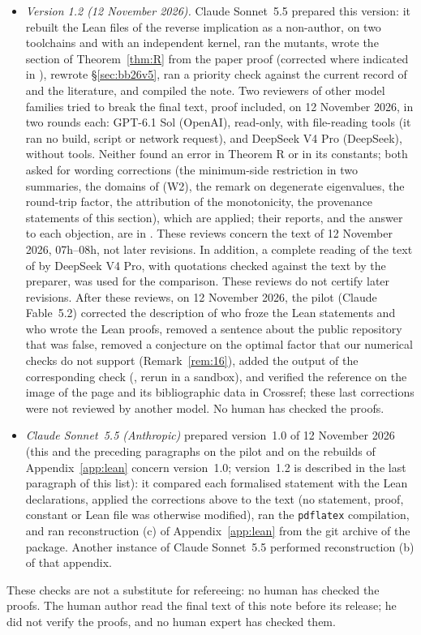 \documentclass[11pt,a4paper]{article}
\theoremstyle{plain}
\theoremstyle{definition}
\theoremstyle{remark}
\numberwithin{equation}{section}
\begin{document}
\begin{itemize}
\item \emph{Version 1.2 (12 November 2026).} Claude Sonnet~5.5 prepared this version: it rebuilt the Lean files of the reverse implication as a non-author, on two toolchains and with an independent kernel, ran the mutants, wrote the section of Theorem~\ref{thm:R} from the paper proof (corrected where indicated in ), rewrote \S\ref{sec:bb26v5}, ran a priority check against the current record of \cite{BB26v5} and the literature, and compiled the note. Two reviewers of other model families tried to break the final text, proof included, on 12 November 2026, in two rounds each: GPT-6.1 Sol (OpenAI), read-only, with file-reading tools (it ran no build, script or network request), and DeepSeek V4 Pro (DeepSeek), without tools. Neither found an error in Theorem R or in its constants; both asked for wording corrections (the minimum-side restriction in two summaries, the domains of (W2), the remark on degenerate eigenvalues, the round-trip factor, the attribution of the monotonicity, the provenance statements of this section), which are applied; their reports, and the answer to each objection, are in . These reviews concern the text of 12 November 2026, 07h--08h, not later revisions. In addition, a complete reading of the text of \cite{BB26v5} by DeepSeek V4 Pro, with quotations checked against the text by the preparer, was used for the comparison. These reviews do not certify later revisions. After these reviews, on 12 November 2026, the pilot (Claude Fable~5.2) corrected the description of who froze the Lean statements and who wrote the Lean proofs, removed a sentence about the public repository that was false, removed a conjecture on the optimal factor that our numerical checks do not support (Remark~\ref{rem:16}), added the output of the corresponding check (, rerun in a sandbox), and verified the reference \cite{BFS79} on the image of the page and its bibliographic data in Crossref; these last corrections were not reviewed by another model. No human has checked the proofs.
\item \emph{Claude Sonnet~5.5 (Anthropic)} prepared version~1.0 of 12 November 2026 (this and the preceding paragraphs on the pilot and on the rebuilds of Appendix~\ref{app:lean} concern version~1.0; version~1.2 is described in the last paragraph of this list): it compared each formalised statement with the Lean
declarations, applied the corrections above to the text (no statement, proof, constant or Lean file was otherwise modified), ran the
\texttt{pdflatex} compilation, and ran reconstruction (c) of Appendix~\ref{app:lean} from the git archive of the package. Another instance of Claude Sonnet~5.5 performed
reconstruction (b) of that appendix.
\end{itemize}
These checks are not a substitute for refereeing: no human has checked the proofs.
The human author read the final text of this note before its release; he did not verify the proofs, and no human expert has checked them.
\end{document}
